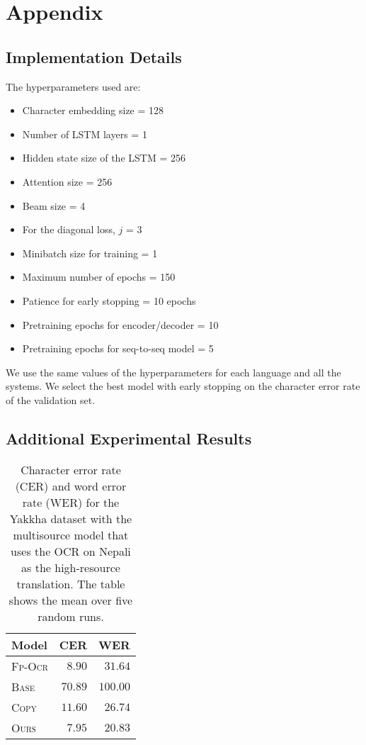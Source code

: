 \appendix
\section{Appendix}
\label{sec:appendix}
\subsection{Implementation Details}

\noindent
The hyperparameters used are:
\begin{itemize}[itemsep=0pt]
    \item Character embedding size = 128
    \item Number of LSTM layers = 1
    \item Hidden state size of the LSTM = 256
    \item Attention size = 256
    \item Beam size = 4
    \item For the diagonal loss, $j$ = 3
    \item Minibatch size for training = 1
    \item Maximum number of epochs = 150
    \item Patience for early stopping = 10 epochs
    \item Pretraining epochs for encoder/decoder = 10
    \item Pretraining epochs for seq-to-seq model = 5
\end{itemize}

\noindent
We use the same values of the hyperparameters for each language and all the systems. We select the best model with early stopping on the character error rate of the validation set.


\subsection{Additional Experimental Results}

\begin{table}[b]
    \centering
    \begin{tabular}{@{}lrr@{}}
    \toprule
    Model & CER & WER \\
    \midrule
    \textsc{Fp-Ocr} & $8.90$ & $31.64$ \\
    \textsc{Base} & $70.89$ & $100.00$ \\
    \textsc{Copy} & $11.60$ & $26.74$ \\
    \textsc{Ours} & $7.95$ & $20.83$ \\
    \bottomrule
    \end{tabular}
    \caption{Character error rate (CER) and word error rate (WER) for the Yakkha dataset with the multisource model that uses the OCR on Nepali as the high-resource translation. The table shows the mean over five random runs.}
    \label{tab:nepali}
    \vspace{2em}
\end{table}


